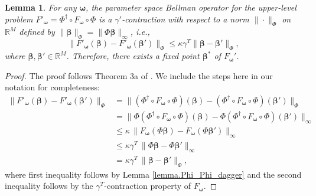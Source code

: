 \documentclass[11pt, notitlepage]{article}
\newcommand{\R}{\mathbb{R}}
\newcommand{\1}{\mathbbm{1}}
\newtheorem{lemma}{Lemma}[section]
\begin{document}
\begin{lemma} \label{lemma.upper_Hprime_contraction}
    For any $\boldsymbol{\omega}$, the parameter space Bellman operator for the upper-level problem $F'_{\boldsymbol{\omega}} = \Phi^{\dagger} \circ F_{\boldsymbol{\omega}} \circ \Phi$ is a $\gamma'$-contraction with respect to a norm $\|\cdot\|_\Phi$ on $\R^M$ defined by $\|\boldsymbol{\beta}\|_\Phi = \| \Phi \boldsymbol{\beta} \|_\infty$, i.e.,
    \begin{equation*}
        \bigl \| F'_{\boldsymbol{\omega}}(\boldsymbol{\beta}) - F'_{\boldsymbol{\omega}}(\boldsymbol{\beta}') \bigr \|_\Phi \leq \kappa \gamma^{T}  \bigl \| \boldsymbol{\beta} - \boldsymbol{\beta}' \bigr \|_\Phi,
    \end{equation*}
    where $\boldsymbol{\beta}, \boldsymbol{\beta}' \in \mathbb{R}^M$. Therefore, there exists a fixed point $\boldsymbol{\beta}^*$ of $F_{\boldsymbol{\omega}}'$.
\end{lemma}
\begin{proof}The proof follows Theorem 3a of \cite{tsitsiklis1996feature}. We include the steps here in our notation for completeness:
    \begin{align*}
        \bigl \| F'_{\boldsymbol{\omega}}(\boldsymbol{\beta}) - F'_{\boldsymbol{\omega}}(\boldsymbol{\beta}') \bigr \|_\Phi
        &= \bigl \| (\Phi^{\dagger} \circ F_{\boldsymbol{\omega}} \circ \Phi) (\boldsymbol{\beta}) - (\Phi^{\dagger} \circ F_{\boldsymbol{\omega}} \circ \Phi) (\boldsymbol{\beta}') \bigr \|_\Phi \\
        &= \bigl \| \Phi (\Phi^{\dagger} \circ F_{\boldsymbol{\omega}} \circ \Phi) (\boldsymbol{\beta}) - \Phi (\Phi^{\dagger} \circ F_{\boldsymbol{\omega}} \circ \Phi) (\boldsymbol{\beta}') \bigr \|_\infty \\
        &\le \kappa \, \bigl\| F_{\boldsymbol{\omega}}(\Phi \boldsymbol{\beta}) - F_{\boldsymbol{\omega}} (\Phi \boldsymbol{\beta}') \bigr\|_\infty \\
        &\leq \kappa \gamma^{T} \, \bigl \| \Phi \boldsymbol{\beta} - \Phi \boldsymbol{\beta}' \bigr \|_\infty \\
        &= \kappa \gamma^{T} \, \bigl \| \boldsymbol{\beta} - \boldsymbol{\beta}' \bigr \|_\Phi,
    \end{align*}
    where first inequality follows by Lemma \ref{lemma.Phi_Phi_dagger} and the second inequality follows by the $\gamma^T$-contraction property of $F_{\boldsymbol{\omega}}$.
\end{proof}
\end{document}
